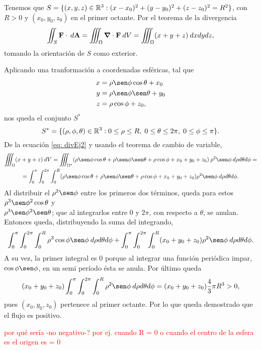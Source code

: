 \begin{solution}
    Tenemos que $S=\{(x,y,z)\in\mathbb{R}^3:
        (x-x_0)^2+(y-y_0)^2+(z-z_0)^2=R^2\}$, con $R>0$ y
    $(x_0,y_0,z_0)$ en el primer octante.
    Por el teorema de la divergencia
    \begin{equation}
        \iint_S \mathbf{F}\cdot\:d\mathbf{A} = \iiint_\Omega
        \grad\cdot\mathbf{F}\:dV
        = \iiint_\Omega (x+y+z)\:dxdydz, \label{eq: divEj2}
    \end{equation}
    tomando la orientaci\'on de $S$ como exterior.

    Aplicando una tranformaci\'on a coordenadas esf\'ericas, tal que
    \begin{align*}
        x & =\rho\sen\phi\cos\theta+x_0 \\
        y & =\rho\sen\phi\sen\theta+y_0 \\
        z & =\rho\cos\phi+z_0,
    \end{align*}
    nos queda el conjunto $S^*$
    \[
        S^*=\{(\rho,\phi,\theta)\in\mathbb{R}^3:0\leq\rho\leq R,\;
        0\leq\theta\leq2\pi,\;0\leq\phi\leq\pi\}.
    \]
    De la ecuaci\'on \eqref{eq: divEj2} y usando el teorema
    de cambio de variable,
    \begin{gather*}
        \iiint_\Omega (x+y+z) \:dV = \iiint_{\Omega^*}
        (\rho\sen\phi\cos\theta + \rho\sen\phi\sen\theta
        + \rho\cos\phi + x_0 + y_0 + z_0)
        \:\rho^2\sen\phi\:d\rho d\theta d\phi=\\
        = \int_0^\pi\int_0^{2\pi}\int_0^R (\rho\sen\phi\cos\theta
        + \rho\sen\phi\sen\theta + \rho\cos\phi
        + x_0 + y_0 + z_0)\rho^2\sen\phi\:d\rho d\theta d\phi.
    \end{gather*}
    Al distribuir el $\rho^2\sen\phi$ entre los primeros dos
    t\'erminos, queda para estos \(\rho^3\sen\phi^2\cos\theta\) y \\
    \(\rho^3\sen\phi^2\sen\theta\); que al integrarlos entre 0
    y $2\pi$, con respecto a $\theta$, se anulan. Entonces queda,
    distribuyendo la suma del integrando,
    \[
        \int_0^\pi\int_0^{2\pi}\int_0^R \rho^3\cos\phi\sen\phi\:
        d\rho d\theta d\phi + \int_0^\pi\int_0^{2\pi}\int_0^R
        (x_0 + y_0 + z_0)\rho^2\sen\phi\:d\rho d\theta d\phi.
    \]
    A su vez, la primer integral es 0 porque al integrar una
    funci\'on peri\'odica impar, $\cos\phi\sen\phi$, en un
    semi per\'iodo \'esta se anula. Por \'ultimo queda
    \[
        (x_0 + y_0 + z_0)\int_0^\pi\int_0^{2\pi}\int_0^R
        \rho^2\sen\phi\:d\rho d\theta d\phi = (x_0 + y_0 + z_0)
        \frac{4}{3}\pi R^3 > 0,
    \]
    pues $(x_0, y_0, z_0)$ pertenece al primer octante.
    Por lo que queda demostrado que el flujo es positivo.

    \textcolor{red}{por qu\'e ser\'ia -no negativo-? por ej. 
    cuando R = 0 o cuando el centro de la esfera es el origen es = 0}
\end{solution}


